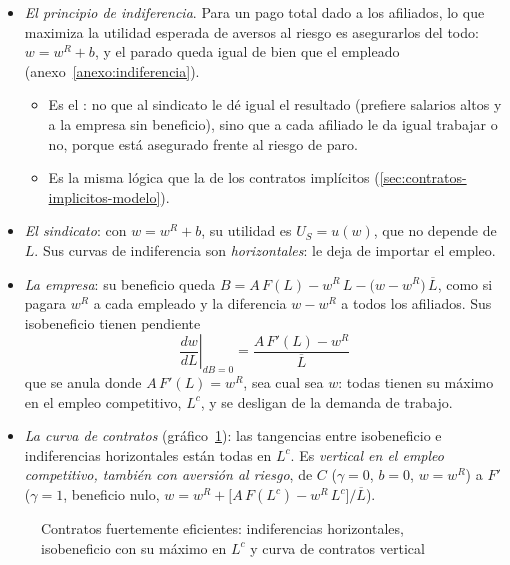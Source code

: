 \documentclass[11pt]{article}
\begin{document}
\begin{itemize}
\item \emph{El principio de indiferencia}. Para un pago total dado a los afiliados, lo que maximiza la utilidad esperada de aversos al riesgo es asegurarlos del todo: $w=w^R+b$, y el parado queda igual de bien que el empleado (anexo~\ref{anexo:indiferencia}).
  \begin{itemize}
  \item Es el : no que al sindicato le dé igual el resultado (prefiere salarios altos y a la empresa sin beneficio), sino que a cada afiliado le da igual trabajar o no, porque está asegurado frente al riesgo de paro\nocite{Cahuc2014Labor}.
  \item Es la misma lógica que la de los contratos implícitos (\ref{sec:contratos-implicitos-modelo}).
  \end{itemize}
\item \emph{El sindicato}: con $w=w^R+b$, su utilidad es $U_S=u(w)$, que no depende de $L$. Sus curvas de indiferencia son \emph{horizontales}: le deja de importar el empleo.
\item \emph{La empresa}: su beneficio queda $B=A\,F(L)-w^R\,L-\big(w-w^R\big)\,\overline{L}$, como si pagara $w^R$ a cada empleado y la diferencia $w-w^R$ a todos los afiliados. Sus isobeneficio tienen pendiente
  \begin{equation}
  \left.\frac{dw}{dL}\right|_{dB=0}=\frac{A\,F'(L)-w^R}{\overline{L}} \label{eq:isobeneficio-fe}
  \end{equation}
  que se anula donde $A\,F'(L)=w^R$, sea cual sea $w$: todas tienen su máximo en el empleo competitivo, $L^c$, y se desligan de la demanda de trabajo.
\item \emph{La curva de contratos} (gráfico~\ref{fig:fuertemente-eficientes}): las tangencias entre isobeneficio e indiferencias horizontales están todas en $L^c$. Es \emph{vertical en el empleo competitivo, también con aversión al riesgo}, de $C$ ($\gamma=0$, $b=0$, $w=w^R$) a $F'$ ($\gamma=1$, beneficio nulo, $w=w^R+\big[A\,F(L^c)-w^R\,L^c\big]/\overline{L}$).
\end{itemize}

\begin{figure}[H]
\centering
\caption{Contratos fuertemente eficientes: indiferencias horizontales, isobeneficio con su máximo en $L^c$ y curva de contratos vertical}\label{fig:fuertemente-eficientes}
\end{figure}
\end{document}
